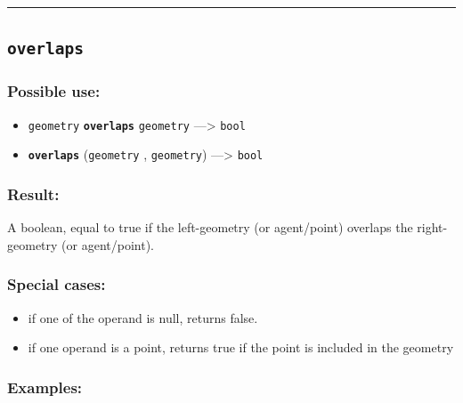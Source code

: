\documentclass[]{book}
\providecommand{\tightlist}{%
  \setlength{\itemsep}{0pt}\setlength{\parskip}{0pt}}
\theoremstyle{definition}
\theoremstyle{definition}
\theoremstyle{definition}
\theoremstyle{remark}
\begin{document}
\begin{center}\rule{0.5\linewidth}{\linethickness}\end{center}

\subsection{\texorpdfstring{\texttt{overlaps}}{overlaps}}\label{overlaps}

\subsubsection{Possible use:}\label{possible-use-391}

\begin{itemize}
\tightlist
\item
  \texttt{geometry} \textbf{\texttt{overlaps}} \texttt{geometry}
  ---\textgreater{} \texttt{bool}
\item
  \textbf{\texttt{overlaps}} (\texttt{geometry} , \texttt{geometry})
  ---\textgreater{} \texttt{bool}
\end{itemize}

\subsubsection{Result:}\label{result-377}

A boolean, equal to true if the left-geometry (or agent/point) overlaps
the right-geometry (or agent/point).

\subsubsection{Special cases:}\label{special-cases-108}

\begin{itemize}
\tightlist
\item
  if one of the operand is null, returns false.\\
\item
  if one operand is a point, returns true if the point is included in
  the geometry
\end{itemize}

\subsubsection{Examples:}\label{examples-269}
\end{document}

